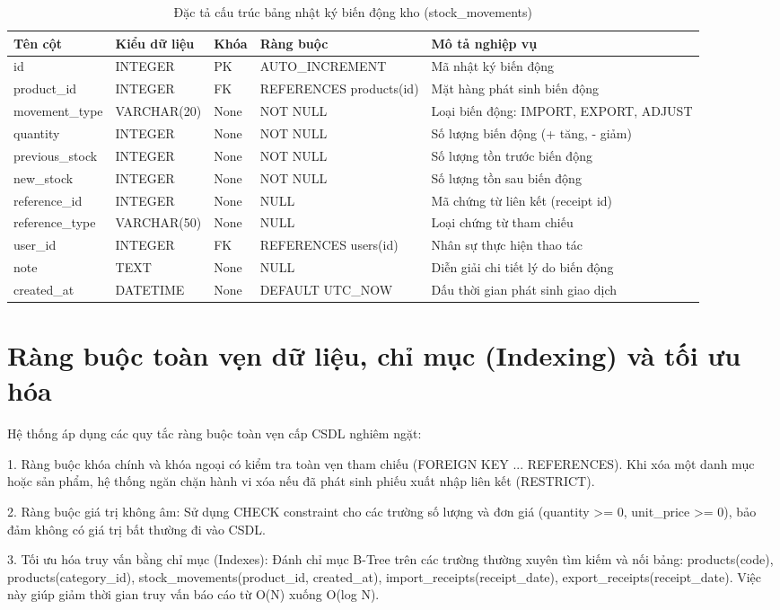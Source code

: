 \begin{table}[h!]
\centering
\caption{Đặc tả cấu trúc bảng nhật ký biến động kho (stock_movements)}
\begin{tabular}{|l|l|l|l|l|}
\hline
\rowcolor{tablehead}
\textbf{Tên cột} & \textbf{Kiểu dữ liệu} & \textbf{Khóa} & \textbf{Ràng buộc} & \textbf{Mô tả nghiệp vụ} \\ \hline
id & INTEGER & PK & AUTO\_INCREMENT & Mã nhật ký biến động \\ \hline
product\_id & INTEGER & FK & REFERENCES products(id) & Mặt hàng phát sinh biến động \\ \hline
movement\_type & VARCHAR(20) & None & NOT NULL & Loại biến động: IMPORT, EXPORT, ADJUST \\ \hline
quantity & INTEGER & None & NOT NULL & Số lượng biến động (+ tăng, - giảm) \\ \hline
previous\_stock & INTEGER & None & NOT NULL & Số lượng tồn trước biến động \\ \hline
new\_stock & INTEGER & None & NOT NULL & Số lượng tồn sau biến động \\ \hline
reference\_id & INTEGER & None & NULL & Mã chứng từ liên kết (receipt id) \\ \hline
reference\_type & VARCHAR(50) & None & NULL & Loại chứng từ tham chiếu \\ \hline
user\_id & INTEGER & FK & REFERENCES users(id) & Nhân sự thực hiện thao tác \\ \hline
note & TEXT & None & NULL & Diễn giải chi tiết lý do biến động \\ \hline
created\_at & DATETIME & None & DEFAULT UTC\_NOW & Dấu thời gian phát sinh giao dịch \\ \hline
\end{tabular}
\end{table}

\section{Ràng buộc toàn vẹn dữ liệu, chỉ mục (Indexing) và tối ưu hóa}

Hệ thống áp dụng các quy tắc ràng buộc toàn vẹn cấp CSDL nghiêm ngặt:

1. Ràng buộc khóa chính và khóa ngoại có kiểm tra toàn vẹn tham chiếu (FOREIGN KEY ... REFERENCES). Khi xóa một danh mục hoặc sản phẩm, hệ thống ngăn chặn hành vi xóa nếu đã phát sinh phiếu xuất nhập liên kết (RESTRICT).

2. Ràng buộc giá trị không âm: Sử dụng CHECK constraint cho các trường số lượng và đơn giá (quantity >= 0, unit\_price >= 0), bảo đảm không có giá trị bất thường đi vào CSDL.

3. Tối ưu hóa truy vấn bằng chỉ mục (Indexes): Đánh chỉ mục B-Tree trên các trường thường xuyên tìm kiếm và nối bảng: products(code), products(category\_id), stock\_movements(product\_id, created\_at), import\_receipts(receipt\_date), export\_receipts(receipt\_date). Việc này giúp giảm thời gian truy vấn báo cáo từ O(N) xuống O(log N).


